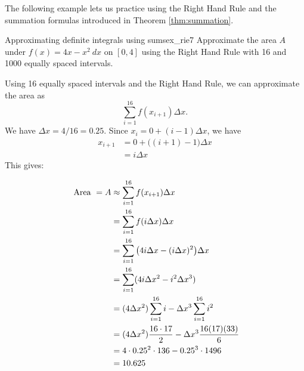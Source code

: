 The following example lets us practice using the Right Hand Rule and the summation formulas introduced in Theorem \ref{thm:summation}.\\

\begin{example}{Approximating definite integrals using sums}{ex_rie7}
{
Approximate the area $ A $ under $f(x) = 4x-x^2 \ dx$ on $ [0,4] $ using the Right Hand Rule with 16 and 1000 equally spaced intervals.
}
\end{example}

\begin{solution}
{Using 16 equally spaced intervals and the Right Hand Rule, we can approximate the area as 
$$\sum_{i=1}^{16}f(x_{i+1})\Delta x.$$
We have $\Delta x = 4/16 = 0.25$. Since $x_i = 0+(i-1)\Delta x$, we have 
\begin{align*}
x_{i+1} &= 0 + \big((i+1)-1\big)\Delta x \\
				&=	i\Delta x
\end{align*}
This gives:\\
\begin{minipage}{.6\textwidth}

\begin{align}
\text{ Area } = A  &\approx \sum_{i=1}^{16} f(x_{i+1})\Delta x \notag\\
											&= \sum_{i=1}^{16} f(i\Delta x) \Delta x\notag\\
									&= \sum_{i=1}^{16} \big(4i\Delta x - (i\Delta x)^2\big)\Delta x\notag\\
									&= \sum_{i=1}^{16} (4i\Delta x^2 - i^2\Delta x^3)\notag\\		
									&= (4\Delta x^2)\sum_{i=1}^{16} i - \Delta x^3 \sum_{i=1}^{16} i^2 \label{eq:rie7}\\
									&= (4\Delta x^2)\frac{16\cdot 17}{2} - \Delta x^3 \frac{16(17)(33)}6 \notag\\
									&=	4\cdot 0.25^2\cdot 136-0.25^3\cdot 1496\notag\\
									&=10.625\notag
\end{align}
\end{minipage}
\begin{minipage}{.35\textwidth}
\begin{center}
  \caption{ \label{fig:rie7} %
  }
\end{center}
\end{minipage}

}
\end{solution}
